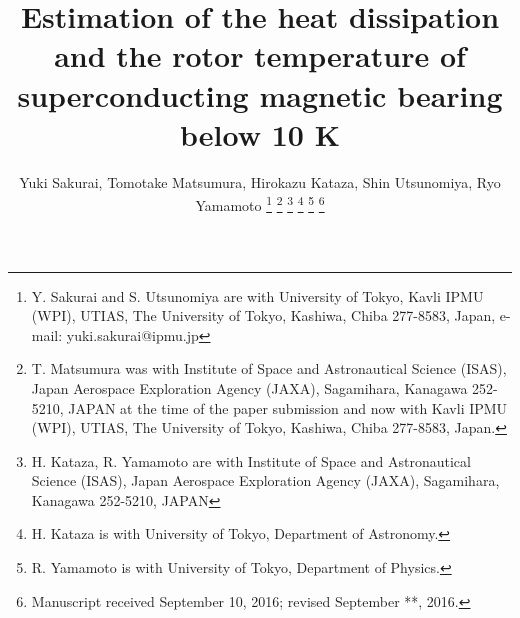 \documentclass[iournal]{IEEEtran}
\begin{document}
%
\title{Estimation of the heat dissipation and the rotor temperature of superconducting magnetic bearing below 10 K}
%
%
%

\author{Yuki Sakurai, Tomotake Matsumura, Hirokazu Kataza, Shin Utsunomiya, Ryo Yamamoto
\thanks{Y. Sakurai and S. Utsunomiya are with University of Tokyo, Kavli IPMU (WPI), UTIAS, The University of Tokyo, Kashiwa, Chiba 277-8583, Japan, e-mail: yuki.sakurai@ipmu.jp}
\thanks{T. Matsumura was with Institute of Space and Astronautical Science (ISAS), Japan Aerospace Exploration Agency (JAXA), Sagamihara, Kanagawa 252-5210, JAPAN at the time of the paper submission and now with Kavli IPMU (WPI), UTIAS, The University of Tokyo, Kashiwa, Chiba 277-8583, Japan.}
\thanks{H. Kataza, R. Yamamoto are with Institute of Space and Astronautical Science (ISAS), Japan Aerospace Exploration Agency (JAXA), Sagamihara, Kanagawa 252-5210, JAPAN}
\thanks{H. Kataza is with University of Tokyo, Department of Astronomy.}
\thanks{R. Yamamoto is with University of Tokyo, Department of Physics.}
\thanks{Manuscript received September 10, 2016; revised September **, 2016.}}

%
%
\end{document}
